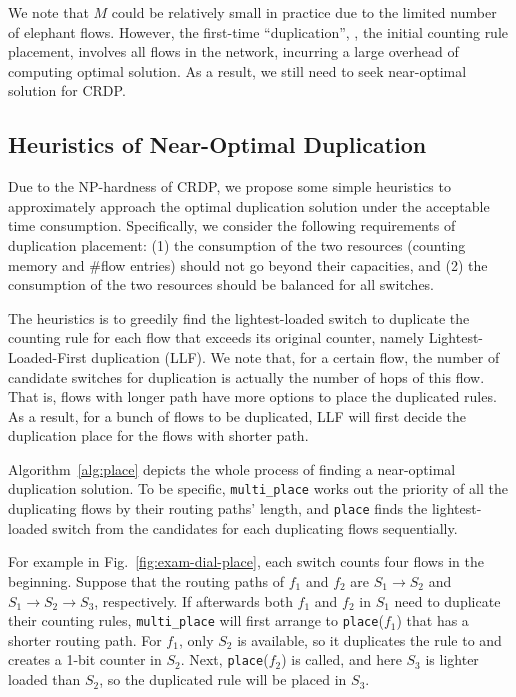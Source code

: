We note that $M$ could be relatively small in practice due to the limited number of elephant flows.
However, the first-time ``duplication'', \ie, the initial counting rule placement, involves all flows in the network, incurring a large overhead of computing optimal solution.
As a result, we still need to seek near-optimal solution for CRDP.

\subsection{Heuristics of Near-Optimal Duplication}\label{sec:dup-alg}
Due to the NP-hardness of CRDP, we propose some simple heuristics to approximately approach the optimal duplication solution under the acceptable time consumption.
Specifically, we consider the following requirements of duplication placement:
(1) the consumption of the two resources (counting memory and \#flow entries) should not go beyond their capacities, and
(2) the consumption of the two resources should be balanced for all switches.

The heuristics is to greedily find the lightest-loaded switch to duplicate the counting rule for each flow that exceeds its original counter, namely Lightest-Loaded-First duplication (LLF).
We note that, for a certain flow, the number of candidate switches for duplication is actually the number of hops of this flow.
That is, flows with longer path have more options to place the duplicated rules.
As a result, for a bunch of flows to be duplicated, LLF will first decide the duplication place for the flows with shorter path.

Algorithm~\ref{alg:place} depicts the whole process of finding a near-optimal duplication solution.
To be specific, \texttt{multi\_place} works out the priority of all the duplicating flows by their routing paths' length, and \texttt{place} finds the lightest-loaded switch from the candidates for each duplicating flows sequentially.

For example in Fig.~\ref{fig:exam-dial-place}, each switch counts four flows in the beginning.
Suppose that the routing paths of $f_1$ and $f_2$ are $S_1 \rightarrow S_2$ and $S_1 \rightarrow S_2\rightarrow S_3$, respectively.
If afterwards both $f_1$ and $f_2$ in $S_1$ need to duplicate their counting rules, \texttt{multi\_place} will first arrange to \texttt{place}($f_1$) that has a shorter routing path.
For $f_1$, only $S_2$ is available, so it duplicates the rule to and creates a 1-bit counter in $S_2$.
Next, \texttt{place}($f_2$) is called, and here $S_3$ is lighter loaded than $S_2$, so the duplicated rule will be placed in $S_3$.

